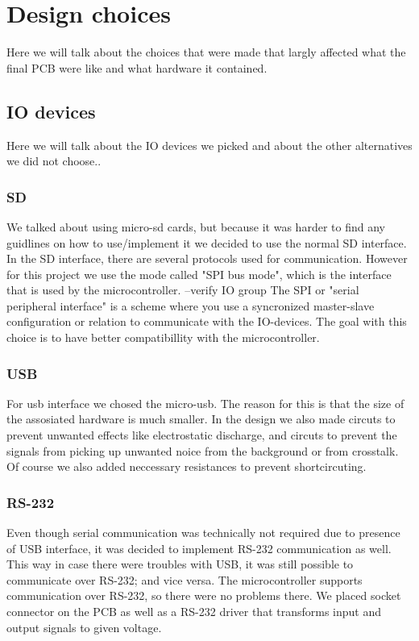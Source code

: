 \section {Design choices}

Here we will talk about the choices that were made that largly affected what the final PCB were like and what hardware it contained.

\subsection{IO devices} \label{pcb:design-choices:ss:IO_devices}
Here we will talk about the IO devices we picked and about the other alternatives we did not choose..

\subsubsection{SD}
We talked about using micro-sd cards, but because it was harder to find any guidlines on how to use/implement it we decided to use the normal SD interface.
In the SD interface, there are several protocols used for communication. 
However for this project we use the mode called "SPI bus mode", which is the interface that is used by the microcontroller.  --verify IO group
The SPI or "serial peripheral interface" is a scheme where you use a syncronized master-slave configuration or relation to communicate with the IO-devices. 
The goal with this choice is to have better compatibillity with the microcontroller.

\subsubsection{USB}
For usb interface we chosed the micro-usb. 
The reason for this is that the size of the assosiated hardware is much smaller.
In the design we also made circuts to prevent unwanted effects like electrostatic discharge, and circuts to prevent the signals from picking up unwanted noice from the background or from crosstalk.
Of course we also added neccessary resistances to prevent shortcircuting.


\subsubsection{RS-232}
Even though serial communication was technically not required due to presence of USB interface, it was decided to implement RS-232 communication as well.
This way in case there were troubles with USB, it was still possible to communicate over RS-232; and vice versa.
The microcontroller supports communication over RS-232, so there were no problems there.
We placed socket connector on the PCB as well as a RS-232 driver that transforms input and output signals to given voltage.

